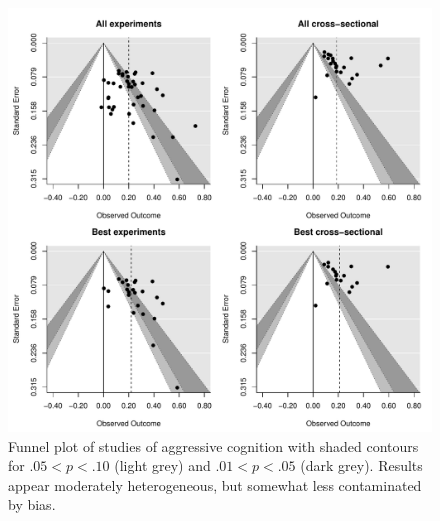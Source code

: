 \documentclass[man, mask]{apa6}
\begin{document}
\begin{figure}
	\includegraphics[width = \textwidth, keepaspectratio]{funnels-0_AggCog.pdf}
	\caption{Funnel plot of studies of aggressive cognition with shaded contours for $.05 < p < .10$ (light grey) and $.01 < p < .05$ (dark grey). Results appear moderately heterogeneous, but somewhat less contaminated by bias.}
	\label{funnel-aggcog}
\end{figure}
\end{document}
